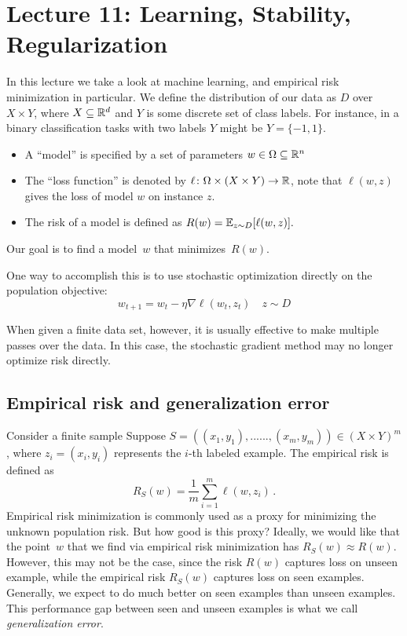 \section{Lecture 11: Learning, Stability, Regularization
}

In this lecture we take a look at machine learning, and empirical risk
minimization in particular. We define the distribution of our data as $D$ over
$X\times Y$, where $X\subseteq \mathbb{R}^{d}$ and $Y$ is some discrete set of class
labels. For instance, in a binary classification tasks with two labels $Y$ 
might be $ Y = \{ -1,1 \}$.
\begin{itemize}
\item A ``model'' is specified by a set of parameters $w \in
\Omega\subseteq\mathbb{R}^n$
\item The ``loss function'' is denoted by $\ell\colon \Omega \times (X\times Y)
\rightarrow \mathbb{R}$, note that $\ell(w,z)$ gives the loss of model $w$ on instance
$z.$
\item The risk of a model is defined as $R(w)=\operatorname*{\mathbb{E}}_{z\sim D}[\ell(w,z)].$
\end{itemize}
Our goal is to find a model~$w$ that minimizes~$R(w).$

One way to accomplish this is to use stochastic optimization directly on the
population objective:
$$w_{t+1} = w_{t} - \eta \nabla \ell(w_t,z_t) \quad z\sim D$$

When given a finite data set, however, it is usually effective to make multiple
passes over the data. In this case, the stochastic gradient method may no longer
optimize risk directly.
%
\subsection{Empirical risk and generalization error}

Consider a finite sample Suppose $S=((x_1,y_1),......,(x_m,y_m))\in(X\times
Y)^m$, where $z_i=(x_i,y_i)$ represents the $i$-th labeled example.
The empirical risk is defined as
\[
R_{S}(w) = \frac{1}{m}\sum_{i=1}^{m}\ell(w,z_i)\,.
\]
Empirical risk minimization is commonly used as a proxy for minimizing the
unknown population risk. But how good is this proxy? Ideally, we would like that
the point~$w$ that we find via empirical risk minimization has $R_S(w)\approx
R(w).$ However, this may not be the case, since the risk $R(w)$ captures loss on
unseen example, while the empirical risk $R_S(w)$ captures loss on seen
examples. Generally, we expect to do much better on seen examples than unseen
examples. This performance gap between seen and unseen examples is what we call
\emph{generalization error}.

